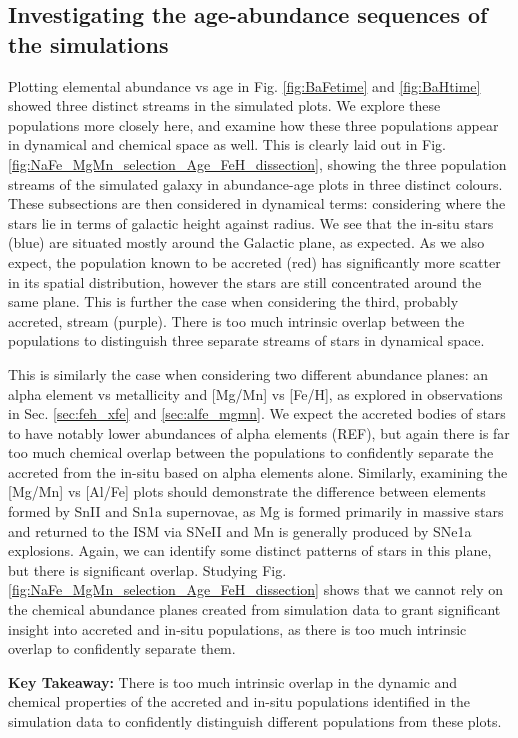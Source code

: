 \documentclass[fleqn,usenatbib]{mnras}
\begin{document}
\subsection{Investigating the age-abundance sequences of the simulations}\label{sec:uncertainties}

Plotting elemental abundance vs age in Fig. \ref{fig:BaFetime} and \ref{fig:BaHtime} showed three distinct streams in the simulated plots. We explore these populations more closely here, and examine how these three populations appear in dynamical and chemical space as well. This is clearly laid out in Fig. \ref{fig:NaFe_MgMn_selection_Age_FeH_dissection}, showing the three population streams of the simulated galaxy in abundance-age plots in three distinct colours. These subsections are then considered in dynamical terms: considering where the stars lie in terms of galactic height against radius. We see that the in-situ stars (blue) are situated mostly around the Galactic plane, as expected. As we also expect, the population known to be accreted (red) has significantly more scatter in its spatial distribution, however the stars are still concentrated around the same plane. This is further the case when considering the third, probably accreted, stream (purple). There is too much intrinsic overlap between the populations to distinguish three separate streams of stars in dynamical space. \par 
This is similarly the case when considering two different abundance planes: an alpha element vs metallicity and [Mg/Mn] vs [Fe/H], as explored in observations in Sec. \ref{sec:feh_xfe} and \ref{sec:alfe_mgmn}. We expect the accreted bodies of stars to have notably lower abundances of alpha elements (REF), but again there is far too much chemical overlap between the populations to confidently separate the accreted from the in-situ based on alpha elements alone. Similarly, examining the [Mg/Mn] vs [Al/Fe] plots should demonstrate the difference between elements formed by SnII and Sn1a supernovae, as Mg is formed primarily in massive stars and returned to the ISM via SNeII \citep{Kobayashi2020} and Mn is generally produced by SNe1a explosions. Again, we can identify some distinct patterns of stars in this plane, but there is significant overlap. Studying Fig. \ref{fig:NaFe_MgMn_selection_Age_FeH_dissection} shows that we cannot rely on the chemical abundance planes created from simulation data to grant significant insight into accreted and in-situ populations, as there is too much intrinsic overlap to confidently separate them. \par 
\textbf{Key Takeaway:} There is too much intrinsic overlap in the dynamic and chemical properties of the accreted and in-situ populations identified in the simulation data to confidently distinguish different populations from these plots. 
\end{document}
